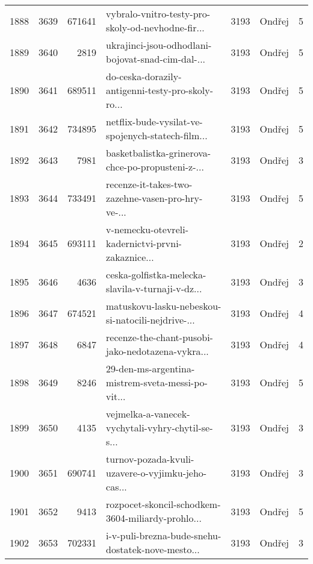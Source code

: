 \begin{tabular}{lrrlrlr}
1888 &       3639 &   671641 &  vybralo-vnitro-testy-pro-skoly-od-nevhodne-fir... &     3193 &                       Ondřej &               5 \\
1889 &       3640 &     2819 &  ukrajinci-jsou-odhodlani-bojovat-snad-cim-dal-... &     3193 &                       Ondřej &               5 \\
1890 &       3641 &   689511 &  do-ceska-dorazily-antigenni-testy-pro-skoly-ro... &     3193 &                       Ondřej &               5 \\
1891 &       3642 &   734895 &  netflix-bude-vysilat-ve-spojenych-statech-film... &     3193 &                       Ondřej &               5 \\
1892 &       3643 &     7981 &  basketbalistka-grinerova-chce-po-propusteni-z-... &     3193 &                       Ondřej &               3 \\
1893 &       3644 &   733491 &  recenze-it-takes-two-zazehne-vasen-pro-hry-ve-... &     3193 &                       Ondřej &               5 \\
1894 &       3645 &   693111 &  v-nemecku-otevreli-kadernictvi-prvni-zakaznice... &     3193 &                       Ondřej &               2 \\
1895 &       3646 &     4636 &  ceska-golfistka-melecka-slavila-v-turnaji-v-dz... &     3193 &                       Ondřej &               3 \\
1896 &       3647 &   674521 &  matuskovu-lasku-nebeskou-si-natocili-nejdrive-... &     3193 &                       Ondřej &               4 \\
1897 &       3648 &     6847 &  recenze-the-chant-pusobi-jako-nedotazena-vykra... &     3193 &                       Ondřej &               4 \\
1898 &       3649 &     8246 &  29-den-ms-argentina-mistrem-sveta-messi-po-vit... &     3193 &                       Ondřej &               5 \\
1899 &       3650 &     4135 &  vejmelka-a-vanecek-vychytali-vyhry-chytil-se-s... &     3193 &                       Ondřej &               3 \\
1900 &       3651 &   690741 &  turnov-pozada-kvuli-uzavere-o-vyjimku-jeho-cas... &     3193 &                       Ondřej &               3 \\
1901 &       3652 &     9413 &  rozpocet-skoncil-schodkem-3604-miliardy-prohlo... &     3193 &                       Ondřej &               5 \\
1902 &       3653 &   702331 &  i-v-puli-brezna-bude-snehu-dostatek-nove-mesto... &     3193 &                       Ondřej &               3 \\

\end{tabular}
